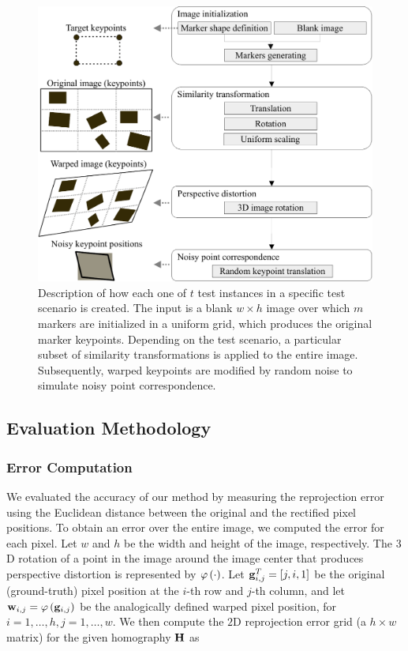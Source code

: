\begin{figure}[t]
    \centering
    \includegraphics[width=0.7\linewidth]{figures/homography/dataset_generating.pdf}
    \caption[Description of creation of test scenarios]{Description of how each one of $t$ test instances in a specific test scenario is created. The input is a blank $w \times h$ image over which $m$ markers are initialized in a uniform grid, which produces the original marker keypoints. Depending on the test scenario, a particular subset of similarity transformations is applied to the entire image. Subsequently, warped keypoints are modified by random noise to simulate noisy point correspondence.}
    \label{fig:DatasetGenerating}
\end{figure}

\subsection{Evaluation Methodology}
\label{ssec:evaluation_methodology}

\subsubsection{Error Computation}
\label{sssec:error_computation}

\def\warpedpix{\vect{w}}
\def\origpix{\vect{g}}

We evaluated the accuracy of our method by measuring the reprojection error using the Euclidean distance between the original and the rectified pixel positions. To obtain an error over the entire image, we computed the error for each pixel. Let $w$ and $h$ be the width and height of the image, respectively. The $3$D rotation of a point in the image around the image center that produces perspective distortion is represented by ${\varphi} \left( \cdot \right)$. Let $\subsup{\origpix}{i,j}{T} = \sbrackets{j, i, 1}$ be the original (ground-truth) pixel position at the $i$-th row and $j$-th column, and let $\warpedpix_{i, j} = \func{\varphi}{\origpix_{i, j}}$ be the analogically defined warped pixel position, for $i = 1, \dots, h, j = 1, \dots, w$. We then compute the $2$D reprojection error grid (a $h \times w$ matrix) for the given homography $\mathbf{H}$ as

